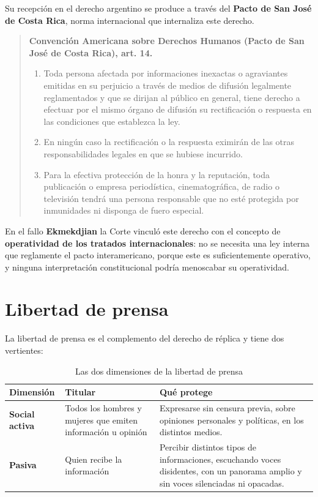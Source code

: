 \documentclass[12pt,oneside]{book}
\begin{document}
Su recepción en el derecho argentino se produce a través del \textbf{Pacto de San José de Costa Rica}, norma internacional que internaliza este derecho.

\begin{quote}
\textbf{Convención Americana sobre Derechos Humanos (Pacto de San José de Costa Rica), art. 14.}
\begin{enumerate}
    \item Toda persona afectada por informaciones inexactas o agraviantes emitidas en su perjuicio a través de medios de difusión legalmente reglamentados y que se dirijan al público en general, tiene derecho a efectuar por el mismo órgano de difusión su rectificación o respuesta en las condiciones que establezca la ley.
    \item En ningún caso la rectificación o la respuesta eximirán de las otras responsabilidades legales en que se hubiese incurrido.
    \item Para la efectiva protección de la honra y la reputación, toda publicación o empresa periodística, cinematográfica, de radio o televisión tendrá una persona responsable que no esté protegida por inmunidades ni disponga de fuero especial.
\end{enumerate}
\end{quote}

En el fallo \textbf{Ekmekdjian} la Corte vinculó este derecho con el concepto de \textbf{operatividad de los tratados internacionales}: no se necesita una ley interna que reglamente el pacto interamericano, porque este es suficientemente operativo, y ninguna interpretación constitucional podría menoscabar su operatividad.

\section{Libertad de prensa}

La libertad de prensa es el complemento del derecho de réplica y tiene dos vertientes:

\begin{table}[H]
\centering
\renewcommand{\arraystretch}{1.3}
\begin{tabularx}{\textwidth}{
    >{\raggedright\arraybackslash}p{}
    >{\raggedright\arraybackslash}p{}
    >{\raggedright\arraybackslash}X
}
\toprule
\textbf{Dimensión} & \textbf{Titular} & \textbf{Qué protege} \\
\midrule
\textbf{Social activa} & Todos los hombres y mujeres que emiten información u opinión & Expresarse sin censura previa, sobre opiniones personales y políticas, en los distintos medios. \\
\textbf{Pasiva} & Quien recibe la información & Percibir distintos tipos de informaciones, escuchando voces disidentes, con un panorama amplio y sin voces silenciadas ni opacadas. \\
\bottomrule
\end{tabularx}
\caption{Las dos dimensiones de la libertad de prensa}
\end{table}
\end{document}
